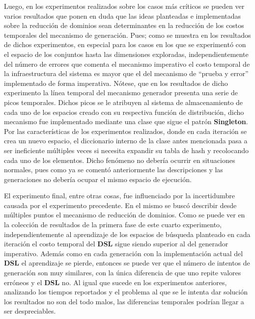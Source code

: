 Luego, en los experimentos realizados sobre los casos más críticos se pueden ver varios resultados que ponen en duda
que las ideas planteadas e implementadas sobre la reducción de dominios sean determinantes en la reducción de los
costos temporales del mecanismo de generación. Pues; como se muestra en los resultados de dichos experimentos,
en especial para los casos en los que se experimentó con el espacio de los conjuntos hasta las dimensiones exploradas,
independientemente del número de errores que comenta el mecanismo imperativo el costo temporal de la infraestructura del
sistema es mayor que el del mecanismo de “prueba y error” implementado de forma imperativa. Nótese, que en los resultados
de dicho experimento la línea temporal del mecanismo generador presenta una serie de picos temporales. Dichos picos se le
atribuyen al sistema de almacenamiento de cada uno de los espacios creado con su respectiva función de distribución,
dicho mecanismo fue implementado mediante una clase que sigue el patrón {\bf Singleton}. Por las características de los experimentos
realizados, donde en cada iteración se crea un nuevo espacio, el diccionario interno de la clase antes mencionada pasa a ser
ineficiente múltiples veces si necesita expandir su tabla de hash y recolocando cada uno de los elementos. Dicho fenómeno no
debería ocurrir en situaciones normales, pues como ya se comentó anteriormente las descripciones y las generaciones no debería
ocupar el mismo espacio de ejecución.


El experimento final, entre otras cosas, fue influenciado por la incertidumbre causada por el experimento precedente.
En el mismo se buscó describir desde múltiples puntos el mecanismo de reducción de dominios. Como se puede ver en la
colección de resultados de la primera fase de este cuarto experimento, independientemente
al aprendizaje de los espacios de búsqueda planteado en cada iteración el costo temporal del {\bf DSL} sigue siendo superior
al del generador imperativo. Además como en cada generación con la implementación actual del {\bf DSL} el aprendizaje se pierde,
entonces se puede ver que el número de intentos de generación son muy similares, con la única diferencia de que uno repite
valores erróneos y el {\bf DSL} no. Al igual que sucede en los experimentos anteriores, analizando los tiempos reportados y el problema
al que se le intenta dar solución los resultados no son del todo malos, las diferencias temporales podrían llegar a ser
despreciables.

